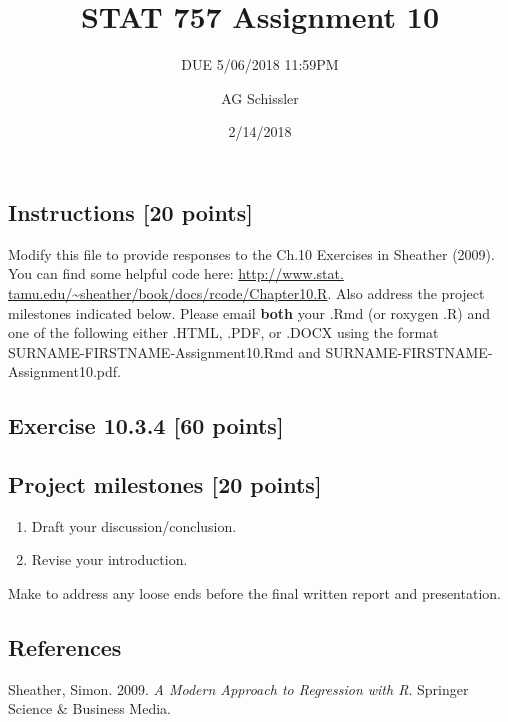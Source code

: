 \documentclass[]{article}
\title{STAT 757 Assignment 10}
\subtitle{DUE 5/06/2018 11:59PM}
\author{AG Schissler}
\date{2/14/2018}
\providecommand{\tightlist}{%
  \setlength{\itemsep}{0pt}\setlength{\parskip}{0pt}}
\begin{document}
\maketitle

\hypertarget{instructions-20-points}{%
\subsection{Instructions {[}20 points{]}}\label{instructions-20-points}}

Modify this file to provide responses to the Ch.10 Exercises in Sheather
(2009). You can find some helpful code here:
\href{http://www.stat.tamu.edu/~sheather/book/docs/rcode/Chapter10.R}{http://www.stat.
tamu.edu/\textasciitilde{}sheather/book/docs/rcode/Chapter10.R}. Also
address the project milestones indicated below. Please email
\textbf{both} your .Rmd (or roxygen .R) and one of the following either
.HTML, .PDF, or .DOCX using the format
SURNAME-FIRSTNAME-Assignment10.Rmd and
SURNAME-FIRSTNAME-Assignment10.pdf.

\hypertarget{exercise-10.3.4-60-points}{%
\subsection{Exercise 10.3.4 {[}60
points{]}}\label{exercise-10.3.4-60-points}}

\hypertarget{project-milestones-20-points}{%
\subsection{Project milestones {[}20
points{]}}\label{project-milestones-20-points}}

\begin{enumerate}
\def\labelenumi{\arabic{enumi}.}
\tightlist
\item
  Draft your discussion/conclusion.
\item
  Revise your introduction.
\end{enumerate}

Make to address any loose ends before the final written report and
presentation.

\hypertarget{references}{%
\subsection*{References}\label{references}}

\hypertarget{refs}{}
\leavevmode\hypertarget{ref-sheather2009}{}%
Sheather, Simon. 2009. \emph{A Modern Approach to Regression with R}.
Springer Science \& Business Media.
\end{document}
